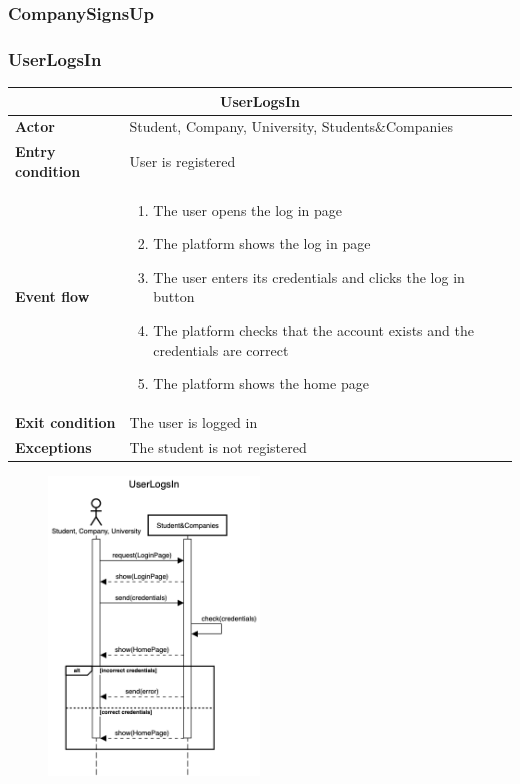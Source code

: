 \subsubsection{CompanySignsUp}

\subsubsection{UserLogsIn}

\begin{table}[H]
    \centering
    \begin{tabular}{|l|m{10cm}|}
        \hline \multicolumn{2}{|c|}{\textbf{UserLogsIn}} \\
        \hline \textbf{Actor} & Student, Company, University, Students\&Companies \\
        \hline \textbf{Entry condition} & User is registered \\
        \hline \textbf{Event flow} &
        \begin{enumerate}
            \item The user opens the log in page
            \item The platform shows the log in page
            \item The user enters its credentials and clicks the log in button
            \item The platform checks that the account exists and the credentials are correct
            \item The platform shows the home page
        \end{enumerate}
        \\
        \hline \textbf{Exit condition} & The user is logged in \\
        \hline \textbf{Exceptions} & The student is not registered \\
        \hline
    \end{tabular}
\end{table}

\begin{figure}[H]
    \centering
    \includegraphics[width=0.5\textwidth]{../../assets/sequence-diagrams/UserLogsIn.png}
\end{figure}




